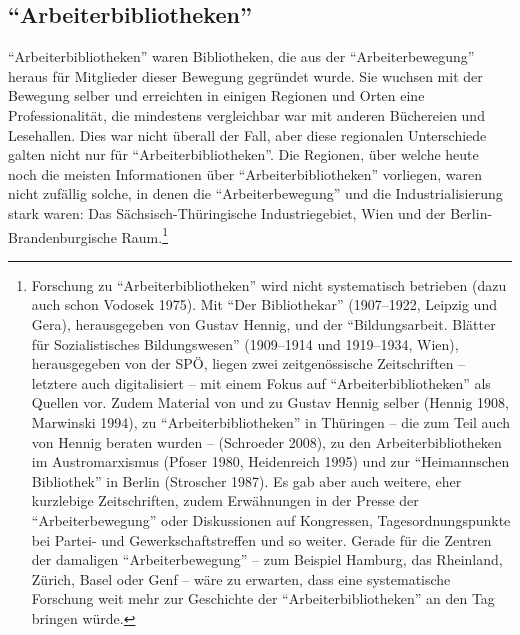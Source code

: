 \documentclass[a4paper,
fontsize=11pt,
oneside,
numbers=noperiodatend,
parskip=half-,
bibliography=totoc,
final
]{scrartcl}
\begin{document}
\hypertarget{arbeiterbibliotheken}{%
\subsection{\texorpdfstring{\enquote{Arbeiterbibliotheken}}{\enquote{Arbeiterbibliotheken}}}\label{arbeiterbibliotheken}}

\enquote{Arbeiterbibliotheken} waren Bibliotheken, die aus der
\enquote{Arbeiterbewegung} heraus für Mitglieder dieser Bewegung
gegründet wurde. Sie wuchsen mit der Bewegung selber und erreichten in
einigen Regionen und Orten eine Professionalität, die mindestens
vergleichbar war mit anderen Büchereien und Lesehallen. Dies war nicht
überall der Fall, aber diese regionalen Unterschiede galten nicht nur
für \enquote{Arbeiterbibliotheken}. Die Regionen, über welche heute noch
die meisten Informationen über \enquote{Arbeiterbibliotheken} vorliegen,
waren nicht zufällig solche, in denen die \enquote{Arbeiterbewegung} und
die Industrialisierung stark waren: Das Sächsisch-Thüringische
Industriegebiet, Wien und der Berlin-Brandenburgische Raum.\footnote{Forschung
  zu \enquote{Arbeiterbibliotheken} wird nicht systematisch betrieben
  (dazu auch schon Vodosek 1975). Mit \enquote{Der Bibliothekar}
  (1907--1922, Leipzig und Gera), herausgegeben von Gustav Hennig, und
  der \enquote{Bildungsarbeit. Blätter für Sozialistisches
  Bildungswesen} (1909--1914 und 1919--1934, Wien), herausgegeben von
  der SPÖ, liegen zwei zeitgenössische Zeitschriften -- letztere auch
  digitalisiert -- mit einem Fokus auf \enquote{Arbeiterbibliotheken}
  als Quellen vor. Zudem Material von und zu Gustav Hennig selber
  (Hennig 1908, Marwinski 1994), zu \enquote{Arbeiterbibliotheken} in
  Thüringen -- die zum Teil auch von Hennig beraten wurden -- (Schroeder
  2008), zu den Arbeiterbibliotheken im Austromarxismus (Pfoser 1980,
  Heidenreich 1995) und zur \enquote{Heimannschen Bibliothek} in Berlin
  (Stroscher 1987). Es gab aber auch weitere, eher kurzlebige
  Zeitschriften, zudem Erwähnungen in der Presse der
  \enquote{Arbeiterbewegung} oder Diskussionen auf Kongressen,
  Tagesordnungspunkte bei Partei- und Gewerkschaftstreffen und so
  weiter. Gerade für die Zentren der damaligen
  \enquote{Arbeiterbewegung} -- zum Beispiel Hamburg, das Rheinland,
  Zürich, Basel oder Genf -- wäre zu erwarten, dass eine systematische
  Forschung weit mehr zur Geschichte der \enquote{Arbeiterbibliotheken}
  an den Tag bringen würde.}
\end{document}
